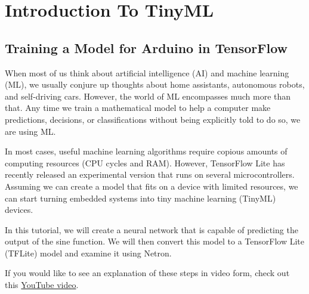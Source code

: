 %
%
%



\chapter{Introduction To TinyML}

\section{Training a Model for Arduino in TensorFlow}



When most of us think about artificial intelligence (AI) and machine learning (ML), we usually conjure up thoughts about home assistants, autonomous robots, and self-driving cars. However, the world of ML encompasses much more than that. Any time we train a mathematical model to help a computer make predictions, decisions, or classifications without being explicitly told to do so, we are using ML. 

In most cases, useful machine learning algorithms require copious amounts of computing resources (CPU cycles and RAM). However, TensorFlow Lite has recently released an experimental version that runs on several microcontrollers. Assuming we can create a model that fits on a device with limited resources, we can start turning embedded systems into tiny machine learning (TinyML) devices.

In this tutorial, we will create a neural network that is capable of predicting the output of the sine function. We will then convert this model to a TensorFlow Lite (TFLite) model and examine it using Netron.

If you would like to see an explanation of these steps in video form, check out this \href{https://www.youtube.com/watch?v=BzzqYNYOcWc&feature=emb_imp_woyt}{YouTube video}.

